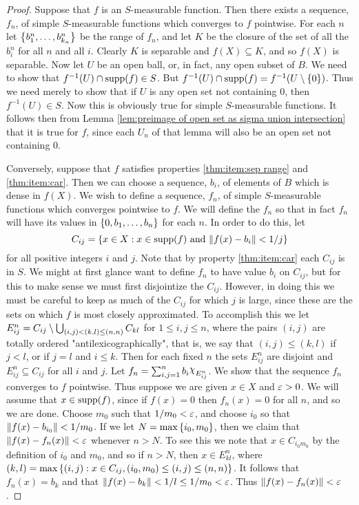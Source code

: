 \begin{proof}
Suppose that $f$ is an $S$-measurable function. Then there exists a sequence, $f_n$, of simple $S$-measurable functions which converges to $f$ pointwise. For each $n$ let $\left\{b_1^n, \dots, b_{k_n}^n\right\}$ be the range of $f_n$, and let $K$ be the closure of the set of all the $b_i^n$ for all $n$ and all $i$. Clearly $K$ is separable and $f(X) \subseteq K$, and so $f(X)$ is separable. Now let $U$ be an open ball, or, in fact, any open subset of $B$. We need to show that $f^{-1}(U)\cap\operatorname{supp}(f)\in S$. But $f^{-1}(U) \cap \operatorname{supp}(f)=f^{-1}(U\setminus\left\{0\right\})$. Thus we need merely to show that if $U$ is any open set not containing 0, then $f^{-1}(U) \in S$. Now this is obviously true for simple $S$-measurable functions. It follows then from Lemma \ref{lem:preimage of open set as sigma union intersection} that it is true for $f$, since each $U_n$ of that lemma will also be an open set not containing 0.

Conversely, suppose that $f$ satisfies properties \ref{thm:item:sep range} and \ref{thm:item:car}. Then we can choose a sequence, $b_i$, of elements of $B$ which is dense in $f(X)$. We wish to define a sequence, $f_n$, of simple $S$-measurable functions which converges pointwise to $f$. We will define the $f_n$ so that in fact $f_n$ will have its values in $\left\{0, b_1, \dots, b_n\right\}$ for each $n$. In order to do this, let $$C_{ij}=\left\{x \in X: x\in \operatorname{supp}(f)\text{ and }\norm{f(x)-b_i}<1/j\right\}$$ for all positive integers $i$ and $j$. Note that by property \ref{thm:item:car} each $C_{i j}$ is in $S$. We might at first glance want to define $f_n$ to have value $b_i$ on $C_{i j}$, but for this to make sense we must first disjointize the $C_{i j}$. However, in doing this we must be careful to keep as much of the $C_{i j}$ for which $j$ is large, since these are the sets on which $f$ is most closely approximated. To accomplish this we let $E_{i j}^n=C_{i j}\setminus\bigcup_{(i,j)<(k,l)\leq(n, n)}C_{k l}$ for $1\leq i, j \leq n$, where the pairs $(i, j)$ are totally ordered "antilexicographically", that is, we say that $(i, j) \leq(k, l)$ if $j<l$, or if $j=l$ and $i \leq k$. Then for each fixed $n$ the sets $E_{i j}^n$ are disjoint and $E_{i j}^n \subseteq C_{i j}$ for all $i$ and $j$. Let $f_n=\sum_{i, j=1}^n b_i \idf{E_{i j}^n}$. We show that the sequence $f_n$ converges to $f$ pointwise. Thus suppose we are given $x \in X$ and $\varepsilon>0$. We will assume that $x \in \operatorname{supp}(f)$, since if $f(x)=0$ then $f_n(x)=0$ for all $n$, and so we are done. Choose $m_0$ such that $1/m_0<\varepsilon$, and choose $i_0$ so that $\norm{f(x)-b_{i_0}}<1/m_0$. If we let $N=\max\left\{i_0, m_0\right\}$, then we claim that $\norm{f(x)-f_n(x)}<\varepsilon$ whenever $n>N$. To see this we note that $x\in C_{i_0m_0}$ by the definition of $i_0$ and $m_0$, and so if $n>N$, then $x \in E^n_{kl}$, where $(k, l)=\max\left\{(i, j): x \in C_{i j},(i_0, m_0) \leq(i, j) \leq(n, n)\right\}$. It follows that $f_n(x)=b_k$ and that $\norm{f(x)-b_k}<1/l \leq 1/m_0<\varepsilon$. Thus $\norm{f(x)-f_n(x)}<\varepsilon$.
\end{proof}

